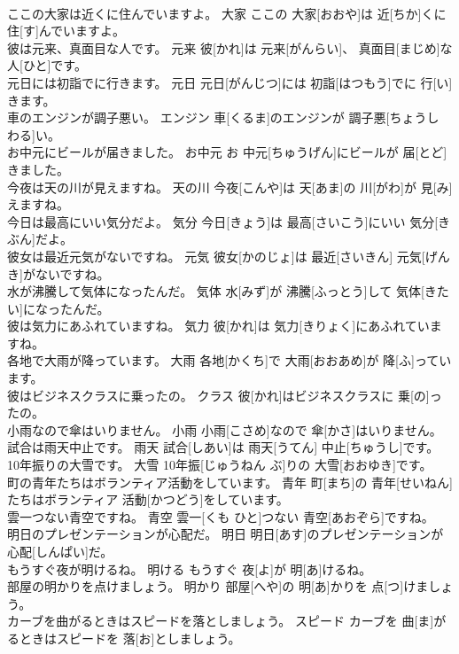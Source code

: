 \documentclass[8pt]{extreport}
\begin{document}
\begin{CJK}{UTF8}{min}
\\	ここの大家は近くに住んでいますよ。	大家	ここの 大家[おおや]は 近[ちか]くに 住[す]んでいますよ。	
\\	彼は元来、真面目な人です。	元来	彼[かれ]は 元来[がんらい]、 真面目[まじめ]な 人[ひと]です。	
\\	元日には初詣でに行きます。	元日	元日[がんじつ]には 初詣[はつもう]でに 行[い]きます。	
\\	車のエンジンが調子悪い。	エンジン	車[くるま]のエンジンが 調子悪[ちょうし わる]い。	
\\	お中元にビールが届きました。	お中元	お 中元[ちゅうげん]にビールが 届[とど]きました。	
\\	今夜は天の川が見えますね。	天の川	今夜[こんや]は 天[あま]の 川[がわ]が 見[み]えますね。	
\\	今日は最高にいい気分だよ。	気分	今日[きょう]は 最高[さいこう]にいい 気分[きぶん]だよ。	
\\	彼女は最近元気がないですね。	元気	彼女[かのじょ]は 最近[さいきん] 元気[げんき]がないですね。	
\\	水が沸騰して気体になったんだ。	気体	水[みず]が 沸騰[ふっとう]して 気体[きたい]になったんだ。	
\\	彼は気力にあふれていますね。	気力	彼[かれ]は 気力[きりょく]にあふれていますね。	
\\	各地で大雨が降っています。	大雨	各地[かくち]で 大雨[おおあめ]が 降[ふ]っています。	
\\	彼はビジネスクラスに乗ったの。	クラス	彼[かれ]はビジネスクラスに 乗[の]ったの。	
\\	小雨なので傘はいりません。	小雨	小雨[こさめ]なので 傘[かさ]はいりません。	
\\	試合は雨天中止です。	雨天	試合[しあい]は 雨天[うてん] 中止[ちゅうし]です。	
\\	10年振りの大雪です。	大雪	10年振[じゅうねん ぶ]りの 大雪[おおゆき]です。	
\\	町の青年たちはボランティア活動をしています。	青年	町[まち]の 青年[せいねん]たちはボランティア 活動[かつどう]をしています。	
\\	雲一つない青空ですね。	青空	雲一[くも ひと]つない 青空[あおぞら]ですね。	
\\	明日のプレゼンテーションが心配だ。	明日	明日[あす]のプレゼンテーションが 心配[しんぱい]だ。	
\\	もうすぐ夜が明けるね。	明ける	もうすぐ 夜[よ]が 明[あ]けるね。	
\\	部屋の明かりを点けましょう。	明かり	部屋[へや]の 明[あ]かりを 点[つ]けましょう。	
\\	カーブを曲がるときはスピードを落としましょう。	スピード	カーブを 曲[ま]がるときはスピードを 落[お]としましょう。	

\end{CJK}
\end{document}

